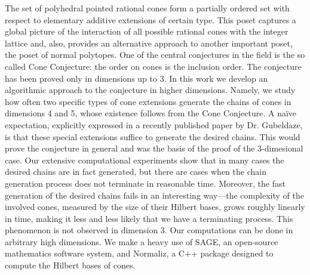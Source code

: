 \documentclass{article}
\begin{document}
The set of polyhedral pointed rational cones form a partially ordered set with respect to elementary additive extensions of certain type. This poset captures a global picture of the interaction of all possible rational cones with the integer lattice and, also, provides
an alternative approach to another important poset, the poset of normal polytopes. One of the central conjectures in the field is the so called Cone Conjecture: the order on cones is the inclusion order. The conjecture has been proved only in dimensions up to 3. In this
work we develop an algorithmic approach to the conjecture in higher dimensions. Namely, we study how often two specific types of cone extensions generate the chains of cones in dimensions 4 and 5, whose existence follows from the Cone Conjecture. A na\"ive expectation, explicitly expressed in a recently published paper by Dr. Gubeldaze, is that these special extensions suffice to generate the desired chains. This would prove the conjecture in general and was the basis of the proof of the 3-dimesional case. Our extensive computational experiments show that in many cases the desired chains are in fact generated, but there are cases when the chain generation process does not terminate in reasonable time. Moreover, the fast generation of the desired chains fails in an interesting way---the complexity of the involved cones, measured by the size of their Hilbert bases, grows roughly linearly in time, making it less and less likely that we have a terminating process. This phenomenon is not observed in dimension 3. Our computations can be done in arbitrary high dimensions. We make a heavy use of SAGE, an open-source mathematics software system, and Normaliz, a C++ package designed to compute the Hilbert bases of cones.
\end{document}
